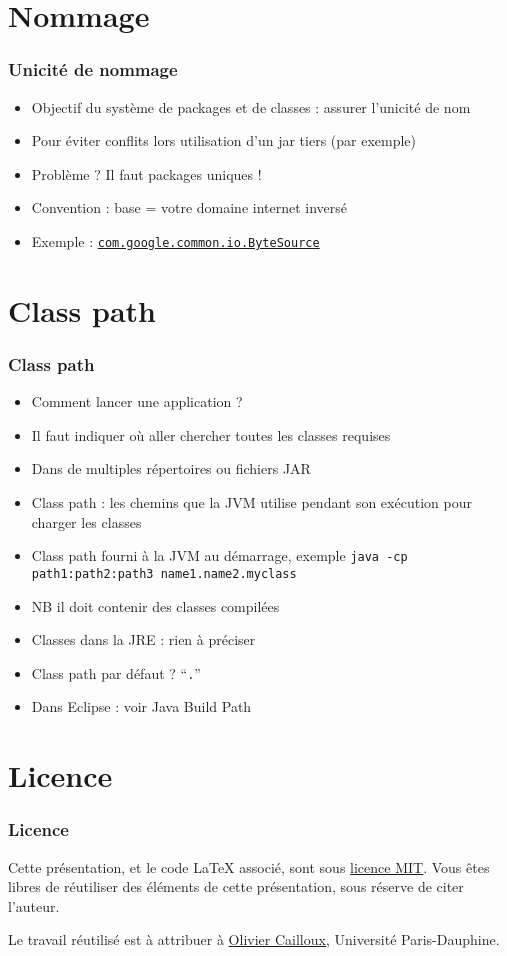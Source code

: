 \documentclass[english, french]{beamer}
\begin{document}
\section{Nommage}
\begin{frame}
	\frametitle{Unicité de nommage}
	\begin{itemize}
		\item Objectif du système de packages et de classes : assurer l’unicité de nom
		\item Pour éviter conflits lors utilisation d’un jar tiers (par exemple)
		\item Problème ? \pause Il faut packages uniques !
		\item Convention : base = votre domaine internet inversé
		\item Exemple : \href{https://github.com/google/guava/blob/master/guava/src/com/google/common/io/ByteSource.java}{\texttt{com.google.common.io.ByteSource}}
	\end{itemize}
\end{frame}

\section{Class path}
\begin{frame}
	\frametitle{Class path}
	\begin{itemize}
		\item Comment lancer une application ?
		\item Il faut indiquer où aller chercher toutes les classes requises
		\item Dans de multiples répertoires ou fichiers JAR
		\item Class path : les chemins que la JVM utilise pendant son exécution pour charger les classes
		\item Class path fourni à la JVM au démarrage, exemple \texttt{java -cp path1:path2:path3 name1.name2.myclass}
		\item NB il doit contenir des classes compilées
		\item Classes dans la JRE : rien à préciser
		\item Class path par défaut ? \pause “\texttt{.}”
		\item Dans Eclipse : voir Java Build Path
	\end{itemize}
\end{frame}

\appendix

\section{Licence}
\begin{frame}
	\frametitle{Licence}
	Cette présentation, et le code LaTeX associé, sont sous \href{http://opensource.org/licenses/MIT}{licence MIT}. Vous êtes libres de réutiliser des éléments de cette présentation, sous réserve de citer l’auteur.
	
	Le travail réutilisé est à attribuer à \href{http://www.lamsade.dauphine.fr/~ocailloux/}{Olivier Cailloux}, Université Paris-Dauphine.
\end{frame}
\end{document}
